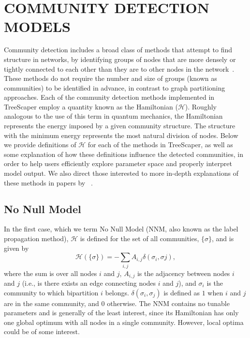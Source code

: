 \documentclass[11pt]{article}
\begin{document}
\newpage
\appendix
\section{COMMUNITY DETECTION MODELS}\label{appendix:CDModels}

Community detection includes a broad class of methods that attempt to find structure in
networks, by identifying groups of nodes that are more densely or tightly connected to each
other than they are to other nodes in the network~\citep{Newman:2010}. These methods do not
require the number and size of groups (known as communities) to be identified in advance,
in contrast to graph partitioning approaches. Each of the community detection methods
implemented in TreeScaper employ a quantity known as the Hamiltonian ($\mathcal{H}$). Roughly
analogous to the use of this term in quantum mechanics, the Hamiltonian represents the
energy imposed by a given community structure. The structure with the minimum energy
represents the most natural division of nodes. Below we provide definitions of $\mathcal{H}$ for each of the methods in TreeScaper, as well as some explanation of how these definitions influence the
detected communities, in order to help users efficiently explore parameter space and properly
interpret model output. We also direct those interested to more in-depth explanations of
these methods in papers by ~\citealp{Fortunato:2010,RB:2006,RAK:2007,TVDN:2011}. \\

\subsection{No Null Model}\label{appendix:NoNullModel}
In the first case, which we term No Null Model (NNM, also known as the label propagation
method), $\mathcal{H}$ is defined for the set of all communities, $\{\sigma\}$, and is given by
\begin{equation}\label{eq:NoNullModel}
\mathcal{H}(\{\sigma\}) = - \displaystyle\sum_{i,j} A_{i,j} \delta(\sigma_{i}, \sigma{j}),
\end{equation}
where the sum is over all nodes $i$ and $j$, $A_{i,j}$ is the adjacency between nodes $i$ and $j$ (i.e., is there exists an edge connecting nodes $i$ and $j$), and $\sigma_{i}$ is the community to which bipartition $i$ belongs. $\delta(\sigma_{i}, \sigma_{j})$ is defined as $1$ when $i$ and $j$ are in the same community, and $0$ otherwise. The NNM contains no tunable parameters and is generally of the least interest, since its Hamiltonian has only one global optimum with all nodes in a single community. However, local optima could be of some interest. \\
\end{document}
